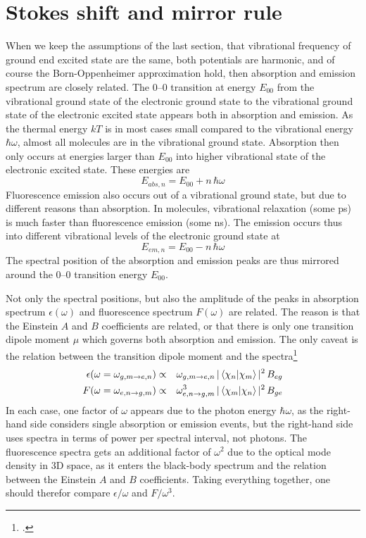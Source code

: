 \section{Stokes shift and mirror rule}


When we keep the assumptions of the last section, that vibrational frequency of ground end excited state are the same, both potentials are harmonic, and of course the Born-Oppenheimer approximation hold, then absorption and emission spectrum are closely related. The 0--0 transition at energy $E_{00}$ from the vibrational ground state of the electronic ground state to the vibrational ground state of the electronic excited state appears both in absorption and emission. As the thermal energy $kT$ is in most cases small compared to the vibrational energy $\hbar \omega$, almost all molecules are in the vibrational ground state. Absorption then only occurs at energies larger than $E_{00}$ into higher vibrational state of the electronic excited state. These energies are
\[
  E_{abs, n} = E_{00} + n \, \hbar \omega
\]
Fluorescence emission also occurs out of a vibrational ground state, but due to different reasons than absorption. In molecules, vibrational relaxation  (some ps) is much faster than fluorescence emission (some ns). The emission occurs thus into different vibrational levels of the electronic ground state at
\[
  E_{em, n} = E_{00} - n \, \hbar \omega
\]
The spectral position of the absorption and emission peaks are thus mirrored around the 0--0 transition  energy $E_{00}$.

Not only the spectral positions, but also the amplitude of the peaks in absorption spectrum $\epsilon(\omega)$ and fluorescence spectrum $F(\omega)$ are related. The reason is that the Einstein $A$ and $B$ coefficients are related, or that there is only one transition dipole moment $\mu$ which governs both absorption and emission. The only caveat is the relation between the transition dipole moment and the spectra\footcite[Chapter 5.2]{Parson}
\begin{eqnarray*}
   \epsilon(\omega  =  \omega_{g,m \rightarrow e,n} )  & \propto & \omega_{g,m \rightarrow e,n}  \,  | \braket{\chi_n |  \chi_m} |^2 
\, B_{eg} \\
   F(\omega =  \omega_{e,n \rightarrow g,m} ) & \propto & \omega_{e,n \rightarrow g,m}^3 \,  | \braket{\chi_m |  \chi_n} |^2 
\, B_{ge}
\end{eqnarray*}
In each case, one factor of $\omega$ appears due to the photon energy $\hbar \omega$, as the right-hand side considers single absorption or emission events,  but the right-hand side uses spectra in terms of power per spectral interval, not photons. The fluorescence spectra gets an additional factor of $\omega^2$ due to the optical mode density in 3D space, as it enters the black-body spectrum and the relation between the Einstein $A$ and $B$ coefficients.
Taking everything together, one should therefor compare $\epsilon / \omega$ and $F / \omega^3$.




